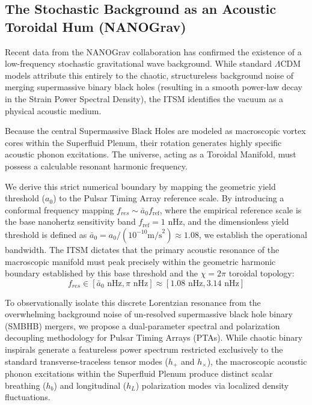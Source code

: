 \documentclass[aps,prd,10pt,onecolumn,superscriptaddress,nofootinbib]{revtex4-2}
\begin{document}
\subsection{The Stochastic Background as an Acoustic Toroidal Hum (NANOGrav)}
Recent data from the NANOGrav collaboration \cite{nanograv} has confirmed the existence of a low-frequency stochastic gravitational wave background. While standard $\Lambda$CDM models attribute this entirely to the chaotic, structureless background noise of merging supermassive binary black holes (resulting in a smooth power-law decay in the Strain Power Spectral Density), the ITSM identifies the vacuum as a physical acoustic medium. 

Because the central Supermassive Black Holes are modeled as macroscopic vortex cores within the Superfluid Plenum, their rotation generates highly specific acoustic phonon excitations. The universe, acting as a Toroidal Manifold, must possess a calculable resonant harmonic frequency.

We derive this strict numerical boundary by mapping the geometric yield threshold ($a_0$) to the Pulsar Timing Array reference scale. By introducing a conformal frequency mapping $f_{res} \sim \bar{a}_0 f_{\text{ref}}$, where the empirical reference scale is the base nanohertz sensitivity band $f_{\text{ref}} = 1 \text{ nHz}$, and the dimensionless yield threshold is defined as $\bar{a}_0 = a_0 / (10^{-10} \text{m/s}^2) \approx 1.08$, we establish the operational bandwidth. The ITSM dictates that the primary acoustic resonance of the macroscopic manifold must peak precisely within the geometric harmonic boundary established by this base threshold and the $\chi=2\pi$ toroidal topology:
\begin{equation}
f_{res} \in [\bar{a}_0 \text{ nHz}, \pi \text{ nHz}] \approx [1.08 \text{ nHz}, 3.14 \text{ nHz}]
\end{equation}

To observationally isolate this discrete Lorentzian resonance from the overwhelming background noise of un-resolved supermassive black hole binary (SMBHB) mergers, we propose a dual-parameter spectral and polarization decoupling methodology for Pulsar Timing Arrays (PTAs). While chaotic binary inspirals generate a featureless power spectrum restricted exclusively to the standard transverse-traceless tensor modes ($h_+$ and $h_{\times}$), the macroscopic acoustic phonon excitations within the Superfluid Plenum produce distinct scalar breathing ($h_b$) and longitudinal ($h_L$) polarization modes via localized density fluctuations. 
\end{document}
